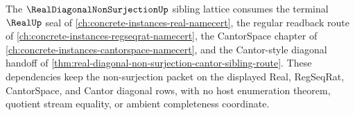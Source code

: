 The $\RealDiagonalNonSurjectionUp$ sibling lattice consumes the terminal $\RealUp$ seal of \autoref{ch:concrete-instances-real-namecert}, the regular readback route of \autoref{ch:concrete-instances-regseqrat-namecert}, the CantorSpace chapter of \autoref{ch:concrete-instances-cantorspace-namecert}, and the Cantor-style diagonal handoff of \autoref{thm:real-diagonal-non-surjection-cantor-sibling-route}. These dependencies keep the non-surjection packet on the displayed Real, RegSeqRat, CantorSpace, and Cantor diagonal rows, with no host enumeration theorem, quotient stream equality, or ambient completeness coordinate.
